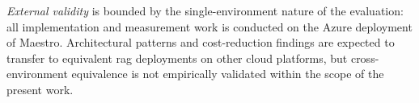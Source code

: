 \textit{External validity} is bounded by the single-environment nature of the
evaluation: all implementation and measurement work is conducted on the Azure
deployment of Maestro.
Architectural patterns and cost-reduction findings are expected to transfer to
equivalent \gls{rag} deployments on other cloud platforms, but cross-environment
equivalence is not empirically validated within the scope of the present work.
